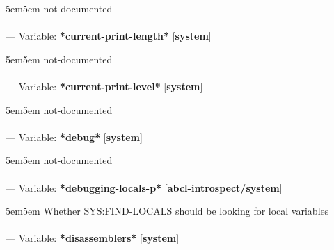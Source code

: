 \begin{adjustwidth}{5em}{5em}
not-documented
\end{adjustwidth}

\paragraph{}
\label{SYSTEM:*CURRENT-PRINT-LENGTH*}
--- Variable: \textbf{*current-print-length*} [\textbf{system}] \textit{}

\begin{adjustwidth}{5em}{5em}
not-documented
\end{adjustwidth}

\paragraph{}
\label{SYSTEM:*CURRENT-PRINT-LEVEL*}
--- Variable: \textbf{*current-print-level*} [\textbf{system}] \textit{}

\begin{adjustwidth}{5em}{5em}
not-documented
\end{adjustwidth}

\paragraph{}
\label{SYSTEM:*DEBUG*}
--- Variable: \textbf{*debug*} [\textbf{system}] \textit{}

\begin{adjustwidth}{5em}{5em}
not-documented
\end{adjustwidth}

\paragraph{}
\label{ABCL-INTROSPECT/SYSTEM:*DEBUGGING-LOCALS-P*}
--- Variable: \textbf{*debugging-locals-p*} [\textbf{abcl-introspect/system}] \textit{}

\begin{adjustwidth}{5em}{5em}
Whether SYS:FIND-LOCALS should be looking for local variables
\end{adjustwidth}

\paragraph{}
\label{SYSTEM:*DISASSEMBLERS*}
--- Variable: \textbf{*disassemblers*} [\textbf{system}] \textit{}

